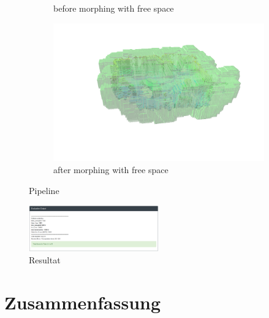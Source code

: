 \documentclass[12pt,titlepage, a4paper]{article}
\begin{document}
\begin{figure}[h!]
\begin{subfigure}[h]{0.45\textwidth}
		\caption{before morphing with free space}
	\end{subfigure}
	\begin{subfigure}[h]{0.45\textwidth}
		\includegraphics[width=\textwidth]{./maps/afterMorph_free.png}
		\caption{after morphing with free space}
	\end{subfigure}
 \caption{Pipeline}
\end{figure}

\begin{figure}[h!]
 \centering
 \includegraphics[width=0.5\textwidth]{./Screens/evaltask2.png}
 \caption{Resultat}
\end{figure}

\section{Zusammenfassung}
  
  
\end{document}
